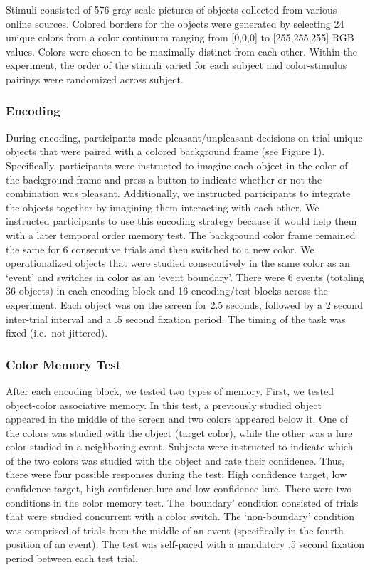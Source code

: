 Stimuli consisted of 576 gray-scale pictures of objects collected from
various online sources. Colored borders for the objects were generated
by selecting 24 unique colors from a color continuum ranging from
{[}0,0,0{]} to {[}255,255,255{]} RGB values. Colors were chosen to be
maximally distinct from each other. Within the experiment, the order of
the stimuli varied for each subject and color-stimulus pairings were
randomized across subject.

\subsubsection{Encoding}\label{encoding}

During encoding, participants made pleasant/unpleasant decisions on
trial-unique objects that were paired with a colored background frame
(see Figure 1). Specifically, participants were instructed to imagine
each object in the color of the background frame and press a button to
indicate whether or not the combination was pleasant. Additionally, we
instructed participants to integrate the objects together by imagining
them interacting with each other. We instructed participants to use this
encoding strategy because it would help them with a later temporal order
memory test. The background color frame remained the same for 6
consecutive trials and then switched to a new color. We operationalized
objects that were studied consecutively in the same color as an `event'
and switches in color as an `event boundary'. There were 6 events
(totaling 36 objects) in each encoding block and 16 encoding/test blocks
across the experiment. Each object was on the screen for 2.5 seconds,
followed by a 2 second inter-trial interval and a .5 second fixation
period. The timing of the task was fixed (i.e.~not jittered).

\subsubsection{Color Memory Test}\label{color-memory-test}

After each encoding block, we tested two types of memory. First, we
tested object-color associative memory. In this test, a previously
studied object appeared in the middle of the screen and two colors
appeared below it. One of the colors was studied with the object (target
color), while the other was a lure color studied in a neighboring event.
Subjects were instructed to indicate which of the two colors was studied
with the object and rate their confidence. Thus, there were four
possible responses during the test: High confidence target, low
confidence target, high confidence lure and low confidence lure. There
were two conditions in the color memory test. The `boundary' condition
consisted of trials that were studied concurrent with a color switch.
The `non-boundary' condition was comprised of trials from the middle of
an event (specifically in the fourth position of an event). The test was
self-paced with a mandatory .5 second fixation period between each test
trial.

